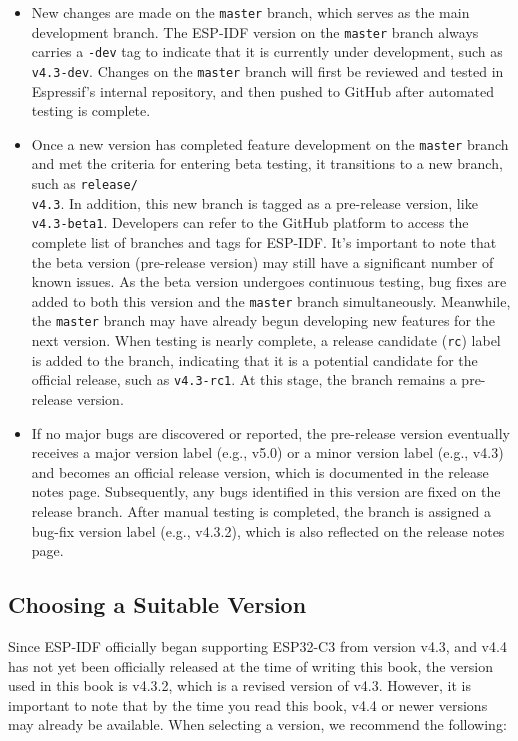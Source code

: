 \documentclass[a4paper,12pt,openany]{book}
\begin{document}
\begin{itemize}[leftmargin=1.5em]
    \item New changes are made on the \verb|master| branch, which serves as the main development branch. The ESP-IDF version on the \verb|master| branch always carries a \verb|-dev| tag to indicate that it is currently under development, such as \verb|v4.3-dev|. Changes on the \verb|master| branch will first be reviewed and tested in Espressif’s internal repository, and then pushed to GitHub after automated testing is complete.
    \item Once a new version has completed feature development on the \verb|master| branch and met the criteria for entering beta testing, it transitions to a new branch, such as \verb|release/|\\ \verb|v4.3|. In addition, this new branch is tagged as a pre-release version, like \verb|v4.3-beta1|. Developers can refer to the GitHub platform to access the complete list of branches and tags for ESP-IDF. It’s important to note that the beta version (pre-release version) may still have a significant number of known issues. As the beta version undergoes continuous testing, bug fixes are added to both this version and the \verb|master| branch simultaneously. Meanwhile, the \verb|master| branch may have already begun developing new features for the next version. When testing is nearly complete, a release candidate (\verb|rc|) label is added to the branch, indicating that it is a potential candidate for the official release, such as \verb|v4.3-rc1|. At this stage, the branch remains a pre-release version.
    \item If no major bugs are discovered or reported, the pre-release version eventually receives a major version label (e.g., v5.0) or a minor version label (e.g., v4.3) and becomes an official release version, which is documented in the release notes page. Subsequently, any bugs identified in this version are fixed on the release branch. After manual testing is completed, the branch is assigned a bug-fix version label (e.g., v4.3.2), which is also reflected on the release notes page.
\end{itemize}

\subsection{Choosing a Suitable Version}
Since ESP-IDF officially began supporting ESP32-C3 from version v4.3, and v4.4 has not yet been officially released at the time of writing this book, the version used in this book is v4.3.2, which is a revised version of v4.3. However, it is important to note that by the time you read this book, v4.4 or newer versions may already be available. When selecting a version, we recommend the following:
\end{document}
